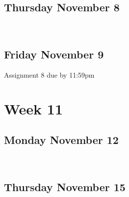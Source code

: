 \documentclass[]{book}
\let\originaltabular\tabular
\let\endoriginaltabular\endtabular
\renewenvironment{tabular}[1]{%
  \begingroup%
  \centering%
  \originaltabular{#1}}%
  {\endoriginaltabular\endgroup}
\theoremstyle{definition}
\theoremstyle{definition}
\theoremstyle{definition}
\theoremstyle{remark}
\begin{document}
\subsection{Thursday November 8}\label{thursday-november-8}

\begin{table}[H]
\centering
\begin{tabular}{l}
\hline
\\
\hline
\end{tabular}
\end{table}

\subsection{Friday November 9}\label{friday-november-9}

\begin{table}[H]
\centering
\begin{tabular}{l}
\hline
Assignment 8 due by 11:59pm\\
\hline
\end{tabular}
\end{table}

\section{Week 11}\label{week-11}

\subsection{Monday November 12}\label{monday-november-12}

\begin{table}[H]
\centering
\begin{tabular}{l}
\hline
\\
\hline
\end{tabular}
\end{table}

\subsection{Thursday November 15}\label{thursday-november-15}

\begin{table}[H]
\centering
\begin{tabular}{l}
\hline
\\
\hline
\end{tabular}
\end{table}
\end{document}
